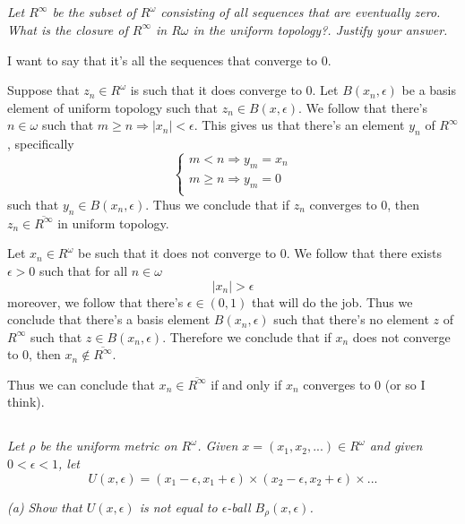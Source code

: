 \documentclass[11pt,oneside,titlepage]{book}
\DeclareMathOperator \ra {\Rightarrow}
\begin{document}
\subsection{}

\textit{Let $R^\infty$ be the subset of $R^\omega$ consisting of all sequences that
  are eventually zero. What is the closure of $R^\infty$ in $R\omega$ in the
  uniform topology?. Justify your answer.}

I want to say that it's all the sequences that converge to 0.

Suppose that $z_n \in R^\omega$  is such that it does converge to 0. Let $B(x_n, \epsilon)$
be a basis element of uniform topology such that $z_n \in B(x, \epsilon)$.
We follow that there's $n \in \omega$ such that $m \geq n \ra |x_n| < \epsilon$.
This gives us that there's an element $y_n$ of $R^\infty$, specifically
$$
\begin{cases}
  m < n \ra y_m = x_n \\
  m \geq  n \ra y_m = 0 \\
\end{cases}
$$
such that $y_n \in B(x_n, \epsilon)$. Thus we conclude that if $z_n$ converges to $0$, then
$z_n \in \overline{R^\infty}$ in uniform topology.

Let $x_n \in R^\omega$  be such that it does not converge to 0.
We follow that there exists $\epsilon > 0$ such that for all $n \in \omega$
$$|x_n| > \epsilon$$
moreover, we follow that there's $\epsilon \in (0, 1)$ that will do the job.
Thus we conclude that there's a basis element $B(x_n, \epsilon)$ such that there's no
element $z$ of $R^\infty$ such that $z \in B(x_n, \epsilon)$. Therefore we
conclude that if $x_n$ does not converge to 0, then $x_n \notin \overline{R^\infty}$.

Thus we can conclude that $x_n \in \overline{R^\infty}$ if and only if $x_n$
converges to 0 (or so I think).

\subsection{}

\textit{Let $\rho$ be the uniform metric on $R^\omega$. Given $x = (x_1, x_2, ...) \in R^\omega$
  and given $0 < \epsilon < 1$, let
  $$U(x, \epsilon) = (x_1 - \epsilon, x_1 + \epsilon) \times
  (x_2 - \epsilon, x_2 + \epsilon) \times ... $$
}

\textit{(a) Show that $U(x, \epsilon)$ is not equal to $\epsilon$-ball $B_\rho(x, \epsilon)$.}
\end{document}
